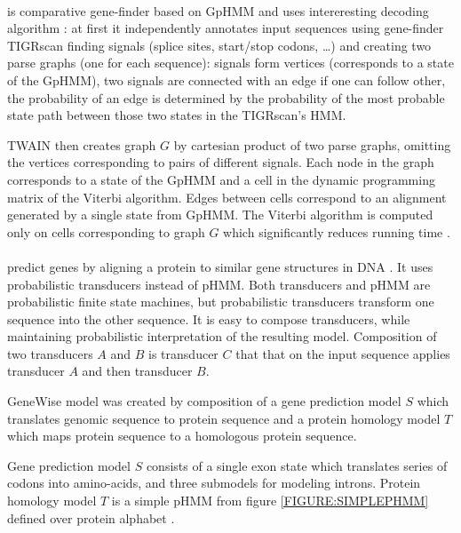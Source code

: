 \paragraph{}  is comparative gene-finder based on GpHMM and
uses intereresting decoding algorithm \cite{Majoros2005}: at first it
independently annotates input sequences using gene-finder TIGRscan
\cite{Majoros2004} finding signals (splice sites, start/stop codons, \dots) and
creating two parse graphs (one for each sequence): signals form vertices
(corresponds to a state of the GpHMM), two signals are connected with an edge
if one can follow other, the probability of an edge is determined by the
probability of the most probable state path between those two states in the
TIGRscan's HMM.

TWAIN then creates graph $G$ by cartesian product of two parse graphs, omitting
the vertices corresponding to pairs of different signals. Each node in the
graph corresponds to a state of the GpHMM and a cell in the dynamic programming
matrix of the Viterbi algorithm.  Edges between cells correspond to an
alignment generated by a single state from GpHMM.  The Viterbi algorithm is
computed only on cells corresponding to graph $G$ which significantly reduces
running time \cite{Majoros2005}.

\paragraph{}
 predict genes by aligning a protein  to similar gene
structures in DNA \cite{GeneWise2004}. It uses probabilistic transducers
instead of pHMM.  Both transducers and pHMM are probabilistic finite state
machines, but probabilistic transducers transform one sequence into the other
sequence.  It is easy to compose transducers, while maintaining probabilistic
interpretation of the resulting model. Composition of two transducers $A$ and
$B$ is transducer $C$ that that on the input sequence applies transducer $A$
and then transducer $B$.

GeneWise model was created by composition of a gene prediction model $S$ which
translates genomic sequence to protein sequence and a protein homology model $T$
which maps protein sequence to a homologous protein sequence.

Gene prediction model $S$ consists of a single exon state which translates
series of codons into amino-acids, and three submodels for modeling introns.
Protein homology model $T$ is a simple pHMM from figure \ref{FIGURE:SIMPLEPHMM}
defined over protein alphabet \cite{GeneWise2004}.

